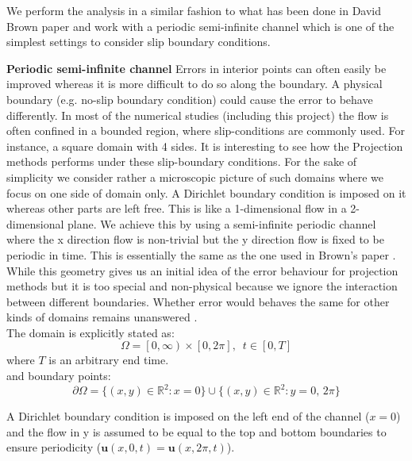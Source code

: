 We perform the analysis in a similar fashion to what has been done in David Brown paper \cite{brown2001accurate} and work with a periodic semi-infinite channel which is one of the simplest settings to consider slip boundary conditions.

\textbf{Periodic semi-infinite channel}
Errors in interior points can often easily be improved whereas it is more difficult to do so along the boundary. A physical boundary (e.g. no-slip boundary condition) could cause the error to behave differently. In most of the numerical studies (including this project) the flow is often confined in a bounded region, where slip-conditions are commonly used. For instance, a square domain with 4 sides. It is interesting to see how the Projection methods performs under these slip-boundary conditions. For the sake of simplicity we consider rather a microscopic picture of such domains where we focus on one side of domain only. A Dirichlet boundary condition is imposed on it whereas other parts are left free. This is like a 1-dimensional flow in a 2-dimensional plane. We achieve this by using a semi-infinite periodic channel where the x direction flow is non-trivial but the y direction flow is fixed to be periodic in time. This is essentially the same as the one used in Brown's paper \cite{brown2001accurate}. While this geometry gives us an initial idea of the error behaviour for projection methods but it is too special and non-physical because we ignore the interaction between different boundaries. Whether error would behaves the same for other kinds of domains remains unanswered \cite{pyo2005normal}. \\

The domain is explicitly stated as:
\begin{equation*}
\Omega = \left[0, \infty \right) \times \left[0, 2\pi\right], \, \, \, t \in [0, T]
\end{equation*}
where $T$ is an arbitrary end time.\\
and boundary points:
\begin{equation*}
\partial \Omega = \{(x,y) \in \mathbb{R}^2: x = 0\} \cup \{(x,y) \in \mathbb{R}^2: y = 0, \, 2\pi\}
\end{equation*}

A Dirichlet boundary condition is imposed on the left end of the channel ($x = 0$) and the flow in y is assumed to be equal to the top and bottom boundaries to ensure periodicity ($\textbf{u}(x,0,t) = \textbf{u}(x,2\pi,t)$).

